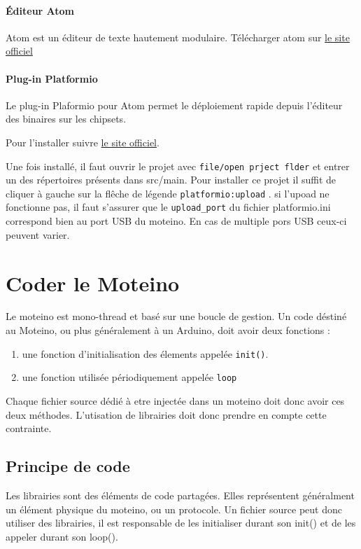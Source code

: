 \documentclass{report}
\begin{document}
\subsubsection{Éditeur Atom}

Atom est un éditeur de texte hautement modulaire.
Télécharger atom sur \href{https://atom.io/}{le site officiel}

\subsubsection{Plug-in Platformio}

Le plug-in Plaformio pour Atom permet le déploiement rapide depuis l'éditeur des binaires sur les chipsets.

Pour l'installer suivre \href{http://docs.platformio.org/en/stable/ide/atom.html#installation}{le site officiel}.

Une fois installé, il faut ouvrir le projet avec \verb+file/open prject flder+ et entrer un des répertoires présents dans src/main. Pour installer ce projet il suffit de cliquer à gauche sur la flêche de légende \verb+platformio:upload+ . si l'upoad ne fonctionne pas, il faut s'assurer que le \verb+upload_port+ du fichier platformio.ini correspond bien au port USB du moteino. En cas de multiple pors USB ceux-ci peuvent varier.

\chapter{Coder le Moteino}

Le moteino est mono-thread et basé sur une boucle de gestion. Un code déstiné au Moteino, ou plus généralement à un Arduino, doit avoir deux fonctions :
\begin{enumerate}
\item une fonction d'initialisation des élements appelée \verb+init()+.
\item une fonction utilisée périodiquement appelée \verb+loop+
\end{enumerate}

Chaque fichier source dédié à etre injectée dans un moteino doit donc avoir ces deux méthodes. L'utisation de librairies doit donc prendre en compte cette contrainte.

\section{Principe de code}

Les librairies sont des éléments de code partagées. Elles représentent généralment un élément physique du moteino, ou un protocole.
Un fichier source peut donc utiliser des librairies, il est responsable de les initialiser durant son init() et de les appeler durant son loop().
\end{document}
